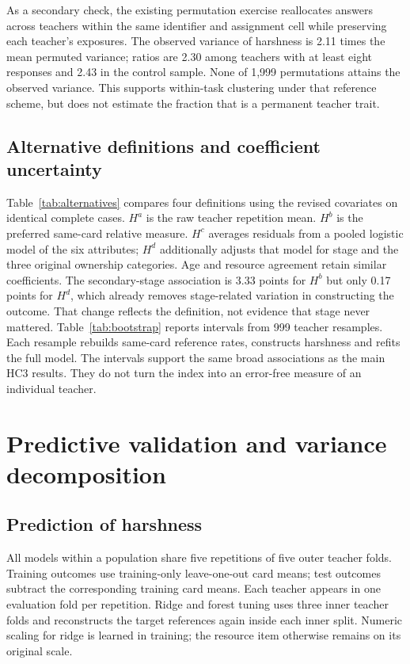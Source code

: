 As a secondary check, the existing permutation exercise reallocates answers across teachers within the same identifier and assignment cell while preserving each teacher's exposures. The observed variance of harshness is 2.11 times the mean permuted variance; ratios are 2.30 among teachers with at least eight responses and 2.43 in the control sample. None of 1,999 permutations attains the observed variance. This supports within-task clustering under that reference scheme, but does not estimate the fraction that is a permanent teacher trait.

\subsection{Alternative definitions and coefficient uncertainty}
Table~\ref{tab:alternatives} compares four definitions using the revised covariates on identical complete cases. $H^a$ is the raw teacher repetition mean. $H^b$ is the preferred same-card relative measure. $H^c$ averages residuals from a pooled logistic model of the six attributes; $H^d$ additionally adjusts that model for stage and the three original ownership categories. Age and resource agreement retain similar coefficients. The secondary-stage association is 3.33 points for $H^b$ but only 0.17 points for $H^d$, which already removes stage-related variation in constructing the outcome. That change reflects the definition, not evidence that stage never mattered.
{\scriptsize{}}
Table~\ref{tab:bootstrap} reports intervals from 999 teacher resamples. Each resample rebuilds same-card reference rates, constructs harshness and refits the full model. The intervals support the same broad associations as the main HC3 results. They do not turn the index into an error-free measure of an individual teacher.

\section{Predictive validation and variance decomposition}\label{app:prediction}
\subsection{Prediction of harshness}
All models within a population share five repetitions of five outer teacher folds. Training outcomes use training-only leave-one-out card means; test outcomes subtract the corresponding training card means. Each teacher appears in one evaluation fold per repetition. Ridge and forest tuning uses three inner teacher folds and reconstructs the target references again inside each inner split. Numeric scaling for ridge is learned in training; the resource item otherwise remains on its original scale.

